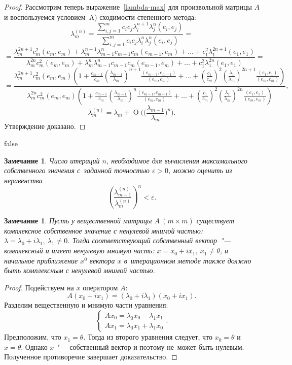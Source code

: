 \documentclass[11pt,a4paper,twoside]{report}
\numberwithin{equation}{section}
\theoremstyle{definition}
\theoremstyle{plain}
\newtheorem{note}{Замечание}[section]
\newtheorem*{note*}{Замечание}
\begin{document}
\begin{proof}
Рассмотрим теперь выражение~\eqref{lambda-max} для произвольной матрицы $A$
и воспользуемся условием~A) сходимости степенного метода:
%
$$
    \lambda_m^{(n)} = \frac{\sum\limits_{i,j=1}^m c_ic_j\lambda_i^{n+1}
    \lambda_j^n(e_i,e_j)}{\sum\limits_{i,j=1}^m c_ic_j\lambda_i^n
    \lambda_j^n(e_i,e_j)}=
$$
%
%
$$
    =\frac{\lambda_m^{2n+1}c_m^2(e_m,e_m)+\lambda^{n+1}_m\lambda_{m-1}^nc_{m-1}
    c_m(e_{m-1},e_m)+\ldots+c_1^2\lambda_1^{2n+1}(e_1,e_1)}
    {\lambda_m^{2n}c_m^2(e_m,e_m)+\lambda^{n}_m\lambda_{m-1}^nc_{m-1}
    c_m(e_{m-1},e_m)+\ldots+c_1^2\lambda_1^{2n}(e_1,e_1)}=
$$
%
%
$$
    =\frac{\lambda_m^{2n+1}c_m^2(e_m,e_m)
    \left(1+\frac{c_{m-1}}{c_m}\left(\frac{\lambda_{m-1}}{\lambda_m}
        \right)^{n+1}
    \frac{(e_{m-1},e_{m-1})}{(e_m,e_m)}+\ldots+
    \left(\frac{c_1}{c_m}\right)^2\left(\frac{\lambda_1}{\lambda_m}
    \right)^{2n+1}
    \frac{(e_1,e_1)}{(e_m,e_m)}
    \right)}
    {\lambda_m^{2n}c_m^2(e_m,e_m)
    \left(1+\frac{c_{m-1}}{c_m}\left(\frac{\lambda_{m-1}}{\lambda_m}\right)^{n}
    \frac{(e_{m-1},e_{m-1})}{(e_m,e_m)}+\ldots+
    \left(\frac{c_1}{c_m}\right)^2\left(\frac{\lambda_1}{\lambda_m}\right)^{2n}
    \frac{(e_1,e_1)}{(e_m,e_m)}
    \right)},
$$
%
%
$$
    \lambda_m^{(n)}=\lambda_m + \operatorname{O}\Biggl(
    \biggl(\frac{\lambda_{m-1}}
    {\lambda_m}\biggr)^n\Biggr).
$$
%
Утверждение доказано.
\end{proof}
%
%
\ifx false
\begin{note}
Число итераций $n$, необходимое для вычисления максимального собственного
значения с~заданной точностью $\varepsilon>0$, можно оценить из неравенства
%
$$
    \left(\frac{\lambda_{m-1}^{(n)}}{\lambda_m^{(n)}}\right)^n <\varepsilon.
$$
%
\end{note}
%
\fi
%
\begin{note*}
Пусть у вещественной матрицы $A~(m\times m)$ существует комплексное собственное
значение с ненулевой мнимой частью:
$\lambda = \lambda_0 + i \lambda_1,~\lambda_1 \ne 0$. Тогда соответствующий
собственный вектор~"--- комплексный и имеет ненулевую мнимую часть:
$x=x_0+ix_1,~x_1\ne\theta$, и начальное приближение $x^0$ вектора $x$
в~итерационном методе также должно быть комплексным с ненулевой мнимой частью.
\end{note*}
%
\begin{proof}
    Подействуем на $x$ оператором $A$:
    $$
        A(x_0 + i x_1) = (\lambda_0 + i\lambda_1)(x_0 + i x_1).
    $$
    Разделим вещественную и мнимую части уравнения:
    $$
    \begin{cases}
        Ax_0 = \lambda_0 x_0 - \lambda_1 x_1\\
        Ax_1 = \lambda_0 x_1 + \lambda_1 x_0
    \end{cases}.
    $$
    Предположим, что $x_1 = \theta$. Тогда из второго уравнения следует, что
    $x_0 = \theta$ и $x = \theta$. Однако $x$~"--- собственный вектор и поэтому
    не~может быть нулевым. Полученное противоречие завершает доказательство.
\end{proof}
%
\end{document}
